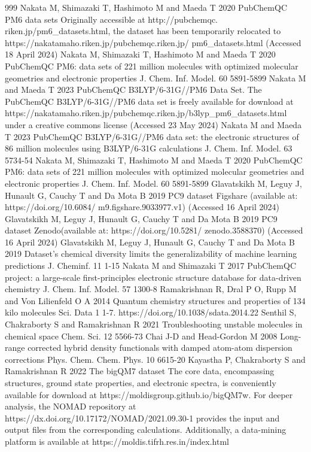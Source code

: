 \documentclass[12pt]{article}
\begin{document}
\begin{thebibliography}{999}
 Nakata M, Shimazaki T, Hashimoto M and Maeda T 2020 PubChemQC PM6 data sets Originally accessible at http://pubchemqc. riken.jp/pm6\_datasets.html, the dataset has been temporarily relocated to https://nakatamaho.riken.jp/pubchemqc.riken.jp/ pm6\_datasets.html (Accessed 18 April 2024)
 Nakata M, Shimazaki T, Hashimoto M and Maeda T 2020 PubChemQC PM6: data sets of 221 million molecules with optimized molecular geometries and electronic properties J. Chem. Inf. Model. 60 5891-5899
 Nakata M and Maeda T 2023 PubChemQC B3LYP/6-31G//PM6 Data Set. The PubChemQC B3LYP/6-31G//PM6 data set is freely available for download at https://nakatamaho.riken.jp/pubchemqc.riken.jp/b3lyp\_pm6\_datasets.html under a creative commons license (Accessed 23 May 2024)
 Nakata M and Maeda T 2023 PubChemQC B3LYP/6-31G//PM6 data set: the electronic structures of 86 million molecules using B3LYP/6-31G calculations J. Chem. Inf. Model. 63 5734-54
 Nakata M, Shimazaki T, Hashimoto M and Maeda T 2020 PubChemQC PM6: data sets of 221 million molecules with optimized molecular geometries and electronic properties J. Chem. Inf. Model. 60 5891-5899
 Glavatskikh M, Leguy J, Hunault G, Cauchy T and Da Mota B 2019 PC9 dataset Figshare (available at: https://doi.org/10.6084/ m9.figshare.9033977.v1) (Accessed 16 April 2024)
 Glavatskikh M, Leguy J, Hunault G, Cauchy T and Da Mota B 2019 PC9 dataset Zenodo(available at: https://doi.org/10.5281/ zenodo.3588370) (Accessed 16 April 2024)
 Glavatskikh M, Leguy J, Hunault G, Cauchy T and Da Mota B 2019 Dataset's chemical diversity limits the generalizability of machine learning predictions J. Cheminf. 11 1-15
 Nakata M and Shimazaki T 2017 PubChemQC project: a large-scale first-principles electronic structure database for data-driven chemistry J. Chem. Inf. Model. 57 1300-8
 Ramakrishnan R, Dral P O, Rupp M and Von Lilienfeld O A 2014 Quantum chemistry structures and properties of 134 kilo molecules Sci. Data 1 1-7. https://doi.org/10.1038/sdata.2014.22
 Senthil S, Chakraborty S and Ramakrishnan R 2021 Troubleshooting unstable molecules in chemical space Chem. Sci. 12 5566-73
 Chai J-D and Head-Gordon M 2008 Long-range corrected hybrid density functionals with damped atom-atom dispersion corrections Phys. Chem. Chem. Phys. 10 6615-20
 Kayastha P, Chakraborty S and Ramakrishnan R 2022 The bigQM7 dataset The core data, encompassing structures, ground state properties, and electronic spectra, is conveniently available for download at https://moldisgroup.github.io/bigQM7w. For deeper analysis, the NOMAD repository at https://dx.doi.org/10.17172/NOMAD/2021.09.30-1 provides the input and output files from the corresponding calculations. Additionally, a data-mining platform is available at https://moldis.tifrh.res.in/index.html

\end{thebibliography}
\end{document}

